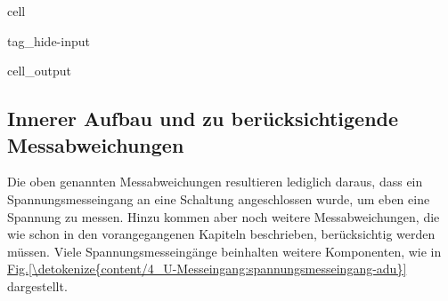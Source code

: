 \documentclass[letterpaper,10pt,english]{jupyterBook}
\begin{document}
\begin{sphinxuseclass}{cell}
\begin{sphinxuseclass}{tag_hide-input}\begin{sphinxVerbatimOutput}

\begin{sphinxuseclass}{cell_output}
\noindent{}

\end{sphinxuseclass}\end{sphinxVerbatimOutput}

\end{sphinxuseclass}
\end{sphinxuseclass}

\subsection{Innerer Aufbau und zu berücksichtigende Messabweichungen}
\label{\detokenize{content/4_U-Messeingang:innerer-aufbau-und-zu-berucksichtigende-messabweichungen}}
\sphinxAtStartPar
Die oben genannten Messabweichungen resultieren lediglich daraus, dass ein Spannungsmesseingang an eine Schaltung angeschlossen wurde, um eben eine Spannung zu messen. Hinzu kommen aber noch weitere Messabweichungen, die wie schon in den vorangegangenen Kapiteln beschrieben, berücksichtig werden müssen. Viele Spannungsmesseingänge beinhalten weitere Komponenten, wie in \hyperref[\detokenize{content/4_U-Messeingang:spannungsmesseingang-adu}]{Fig.\@ \ref{\detokenize{content/4_U-Messeingang:spannungsmesseingang-adu}}} dargestellt.
\end{document}
